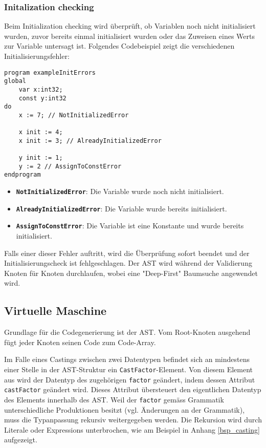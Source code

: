 \documentclass[10pt, a4paper, twocolumn]{article} %
\begin{document}
\subsubsection*{Initalization checking}
Beim Initialization checking wird überprüft, ob Variablen noch nicht initialisiert wurden, zuvor bereits einmal initialisiert wurden oder das Zuweisen eines Werts zur Variable untersagt ist.
Folgendes Codebeispiel zeigt die verschiedenen Initialisierungsfehler:
\begin{lstlisting}
program exampleInitErrors
global
    var x:int32;
    const y:int32
do
    x := 7; // NotInitializedError

    x init := 4;
    x init := 3; // AlreadyInitializedError

    y init := 1;
    y := 2 // AssignToConstError
endprogram
\end{lstlisting}

\begin{itemize}
    \item \texttt{\textbf{NotInitializedError}}: Die Variable wurde noch nicht initialisiert.
    \item \texttt{\textbf{AlreadyInitializedError}}: Die Variable wurde bereits initialisiert.
    \item \texttt{\textbf{AssignToConstError}}: Die Variable ist eine Konstante und wurde bereits initialisiert.
\end{itemize}

Falls einer dieser Fehler auftritt, wird die Überprüfung sofort beendet und der Initialisierungscheck ist fehlgeschlagen.
Der AST wird während der Validierung Knoten für Knoten durchlaufen, wobei eine "Deep-First" Baumsuche angewendet wird.

\subsection{Virtuelle Maschine}
Grundlage für die Codegenerierung ist der AST.
Vom Root-Knoten ausgehend fügt jeder Knoten seinen Code zum Code-Array.

Im Falle eines Castings zwischen zwei Datentypen befindet sich an mindestens einer Stelle in der AST-Struktur ein \texttt{CastFactor}-Element.
Von diesem Element aus wird der Datentyp des zugehörigen \texttt{factor} geändert, indem dessen Attribut \texttt{castFactor} geändert wird.
Dieses Attribut übersteuert den eigentlichen Datentyp des Elements innerhalb des AST.
Weil der \texttt{factor} gemäss Grammatik unterschiedliche Produktionen besitzt (vgl. Änderungen an der Grammatik), muss die Typanpassung rekursiv weitergegeben werden.
Die Rekursion wird durch Literale oder Expressions unterbrochen, wie am Beispiel in Anhang \ref{bsp_casting} aufgezeigt.
\end{document}

